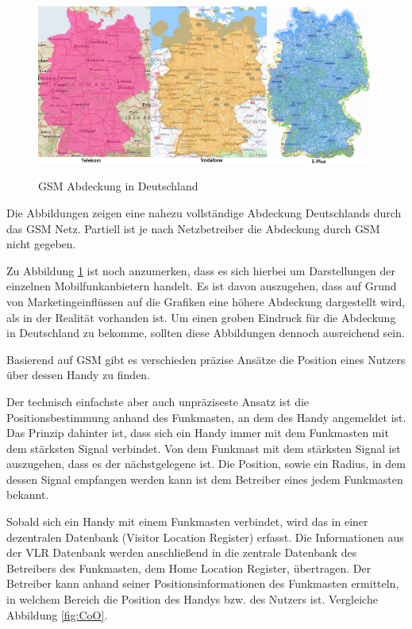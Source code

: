 \begin{figure}[h]
\centering
\includegraphics[width=0.99\textwidth]{ref/images/GSM.PNG}
\caption[GSM Abdeckung in Deutschland]{GSM Abdeckung in Deutschland}
\label{fig:GSM}
\cite{Telekom} \cite{Vodafone} \cite{Eplus}
\end{figure}

Die Abbildungen zeigen eine nahezu vollständige Abdeckung Deutschlands durch das GSM Netz. Partiell ist je nach Netzbetreiber die Abdeckung durch GSM nicht gegeben.

Zu Abbildung \ref{fig:GSM} ist noch anzumerken, dass es sich hierbei um Darstellungen der einzelnen Mobilfunkanbietern handelt. Es ist davon auszugehen, dass auf Grund von Marketingeinflüssen auf die Grafiken eine höhere Abdeckung dargestellt wird, als in der Realität vorhanden ist. Um einen groben Eindruck für die Abdeckung in Deutschland zu bekomme, sollten diese Abbildungen dennoch ausreichend sein.


Basierend auf GSM gibt es verschieden präzise Ansätze die Position eines Nutzers über dessen Handy zu finden.


Der technisch einfachste aber auch unpräziseste Ansatz ist die Positionsbestimmung anhand des Funkmasten, an dem des Handy angemeldet ist. Das Prinzip dahinter ist, dass sich ein Handy immer mit dem Funkmasten mit dem stärksten Signal verbindet. Von dem Funkmast mit dem stärksten Signal ist auszugehen, dass es der nächstgelegene ist. Die Position, sowie ein Radius, in dem dessen Signal empfangen werden kann ist dem Betreiber eines jedem Funkmasten bekannt. 

Sobald sich ein Handy mit einem Funkmasten verbindet, wird das in einer dezentralen Datenbank (Visitor Location Register) erfasst. Die Informationen aus der VLR Datenbank werden anschließend in die zentrale Datenbank des Betreibers des Funkmasten, dem Home Location Register, übertragen. Der Betreiber kann anhand seiner Positionsinformationen des Funkmasten ermitteln, in welchem Bereich die Position des Handys bzw. des Nutzers ist. Vergleiche Abbildung \ref{fig:CoO}.

